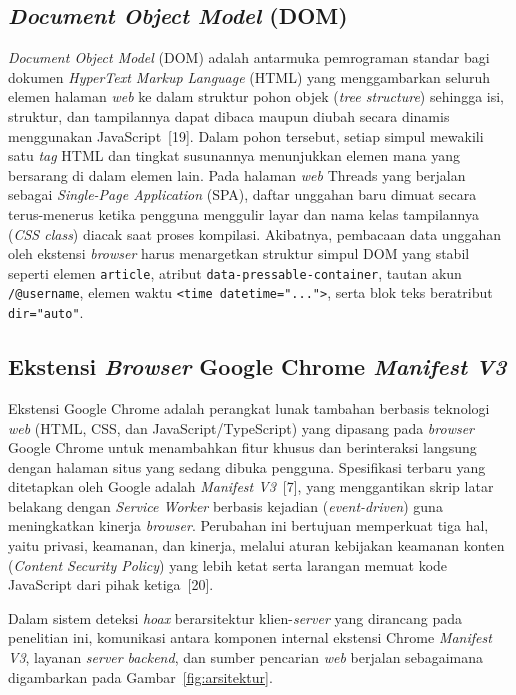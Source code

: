 \documentclass[12pt,a4paper,twoside]{report}
\begin{document}
\subsection{\textit{Document Object Model} (DOM)}

\textit{Document Object Model} (DOM) adalah antarmuka pemrograman standar bagi dokumen \textit{HyperText Markup Language} (HTML) yang menggambarkan seluruh elemen halaman \textit{web} ke dalam struktur pohon objek (\textit{tree structure}) sehingga isi, struktur, dan tampilannya dapat dibaca maupun diubah secara dinamis menggunakan JavaScript~[19]. Dalam pohon tersebut, setiap simpul mewakili satu \textit{tag} HTML dan tingkat susunannya menunjukkan elemen mana yang bersarang di dalam elemen lain. Pada halaman \textit{web} Threads yang berjalan sebagai \textit{Single-Page Application} (SPA), daftar unggahan baru dimuat secara terus-menerus ketika pengguna menggulir layar dan nama kelas tampilannya (\textit{CSS class}) diacak saat proses kompilasi. Akibatnya, pembacaan data unggahan oleh ekstensi \textit{browser} harus menargetkan struktur simpul DOM yang stabil seperti elemen \texttt{article}, atribut \texttt{data-pressable-\allowbreak container}, tautan akun \texttt{/@username}, elemen waktu \texttt{<time datetime="...">}, serta blok teks beratribut \texttt{dir="auto"}.

\subsection{Ekstensi \textit{Browser} Google Chrome \textit{Manifest V3}}

Ekstensi Google Chrome adalah perangkat lunak tambahan berbasis teknologi \textit{web} (HTML, CSS, dan JavaScript/TypeScript) yang dipasang pada \textit{browser} Google Chrome untuk menambahkan fitur khusus dan berinteraksi langsung dengan halaman situs yang sedang dibuka pengguna. Spesifikasi terbaru yang ditetapkan oleh Google adalah \textit{Manifest V3}~[7], yang menggantikan skrip latar belakang dengan \textit{Service Worker} berbasis kejadian (\textit{event-driven}) guna meningkatkan kinerja \textit{browser}. Perubahan ini bertujuan memperkuat tiga hal, yaitu privasi, keamanan, dan kinerja, melalui aturan kebijakan keamanan konten (\textit{Content Security Policy}) yang lebih ketat serta larangan memuat kode JavaScript dari pihak ketiga~[20].

Dalam sistem deteksi \textit{hoax} berarsitektur klien-\textit{server} yang dirancang pada penelitian ini, komunikasi antara komponen internal ekstensi Chrome \textit{Manifest V3}, layanan \textit{server} \textit{backend}, dan sumber pencarian \textit{web} berjalan sebagaimana digambarkan pada Gambar~\ref{fig:arsitektur}.
\end{document}
